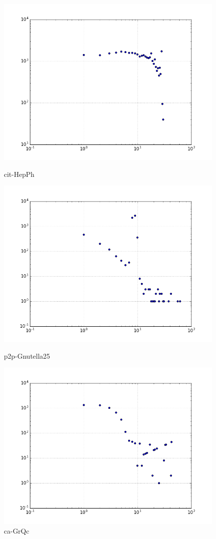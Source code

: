 \begin{figure}[H]
  \includegraphics[width=\linewidth]{img/cit-HepPh/kcore_dist.png}
  \caption*{cit-HepPh}
\endminipage\hfill
{}
  \includegraphics[width=\linewidth]{img/p2p-Gnutella25/kcore_dist.png}
  \caption*{p2p-Gnutella25}
\endminipage\hfill
{}
  \includegraphics[width=\linewidth]{img/ca-GrQc/kcore_dist.png}
  \caption*{ca-GrQc}
\endminipage
\end{figure}
